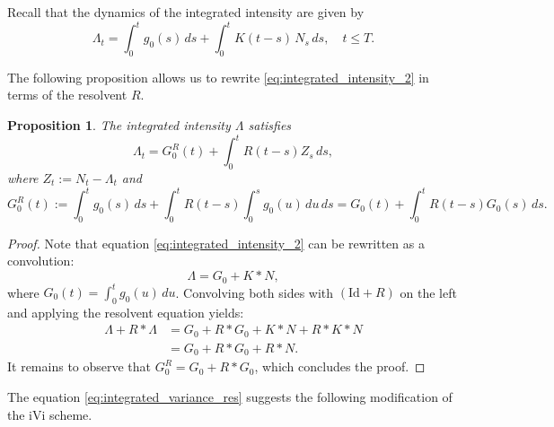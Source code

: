 \documentclass{article}
\newcommand{\1}{\mathbbm{1}}
\newtheorem{proposition}[theorem]{Proposition}
\numberwithin{equation}{section}
\begin{document}
Recall that the dynamics of the integrated intensity are given by
\begin{equation}\label{eq:integrated_intensity_2}
\Lambda_t = \int_0^t g_0(s)\,ds + \int_0^t K(t-s)\,N_s\,ds, \quad t \leq T.
\end{equation}

The following proposition allows us to rewrite \eqref{eq:integrated_intensity_2} in terms of the resolvent $R$.
\begin{proposition}
    The integrated intensity $\Lambda$ satisfies 
    \begin{equation}\label{eq:integrated_variance_res}
        \Lambda_t = G_0^R(t) + \int_0^t R(t-s)Z_s\,ds,
    \end{equation}
    where $Z_t := N_t - \Lambda_t$ and
    \[
    G_0^R(t) := \int_0^t g_0(s)\,ds + \int_0^t R(t - s)\int_0^s g_0(u)\,du\,ds =  G_0(t) + \int_0^t R(t - s)G_0(s)\,ds.
    \]
\end{proposition}

\begin{proof}
Note that equation \eqref{eq:integrated_intensity_2} can be rewritten as a convolution:
\begin{equation*}
    \Lambda = G_0 + K * N,
\end{equation*}
where $G_0(t) = \int_0^t g_0(u)\,du$. Convolving both sides with $(\mathrm{Id} + R)$ on the left and applying the resolvent equation yields:
\begin{align*}
    \Lambda + R * \Lambda &= G_0 + R * G_0 + K * N + R * K * N \\
    &= G_0 + R * G_0 + R * N.
\end{align*}
It remains to observe that $G_0^R = G_0 + R * G_0$, which concludes the proof.
\end{proof}

The equation \eqref{eq:integrated_variance_res} suggests the following modification of the iVi scheme.
\end{document}
